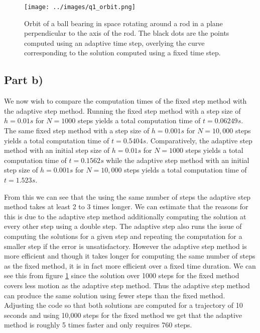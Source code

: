 \documentclass{article}
\begin{document}
\begin{figure}[H]
	\centering
	\texttt{[image: ../images/q1\_orbit.png]}
	\caption{Orbit of a ball bearing in space rotating around a rod in a plane perpendicular to the axis of the rod. The black dots are the points computed using an adaptive time step, overlying the curve corresponding to the solution computed using a fixed time step.}
	\label{fig:q1_a}
\end{figure}

\subsection{Part b)}
We now wish to compare the computation times of the fixed step method with the adaptive step method. Running the fixed step method with a step size of $h=0.01s$ for $N=1000$ steps yields a total computation time of $t=0.06249s$. The same fixed step method with a step size of $h=0.001s$ for $N=10,000$ steps yields a total computation time of $t=0.5404s$.
Comparatively, the adaptive step method with an initial step size of $h=0.01s$ for $N=1000$ steps yields a total computation time of $t=0.1562s$ while the adaptive step method with an initial step size of $h=0.001s$ for $N=10,000$ steps yields a total computation time of $t=1.523s$.

From this we can see that the using the same number of steps the adaptive step method takes at least 2 to 3 times longer. We can estimate that the reasons for this is due to the adaptive step method additionally computing the solution at every other step using a double step. The adaptive step also runs the issue of computing the solutions for a given step and repeating the computation for a smaller step if the error is unsatisfactory. However the adaptive step method is more efficient and though it takes longer for computing the same number of steps as the fixed method, it is in fact more efficient over a fixed time duration. We can see this from figure \ref{fig:q1_a} since the solution over 1000 steps for the fixed method covers less motion as the adaptive step method. Thus the adaptive step method can produce the same solution using fewer steps than the fixed method. Adjusting the code so that both solutions are computed for a trajectory of 10 seconds and using 10,000 steps for the fixed method we get that the adaptive method is roughly 5 times faster and only requires 760 steps.
\end{document}
